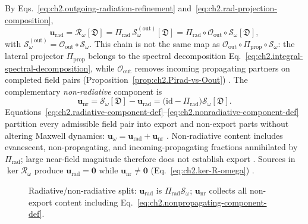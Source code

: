 By Eqs.~\eqref{eq:ch2.outgoing-radiation-refinement} and~\eqref{eq:ch2.rad-projection-composition},
\begin{equation}
\label{eq:ch2.radiative-component-def}
\mathbf{u}_{\mathrm{rad}}
=
\mathcal{R}_\omega[\mathfrak{D}]
=
\Pi_{\mathrm{rad}}\,\mathcal{S}_\omega^{\mathrm{(out)}}[\mathfrak{D}]
=
\Pi_{\mathrm{rad}}\circ\mathcal{O}_{\mathrm{out}}\circ\mathcal{S}_\omega[\mathfrak{D}],
\end{equation}
with $\mathcal{S}_\omega^{\mathrm{(out)}}=\mathcal{O}_{\mathrm{out}}\circ\mathcal{S}_\omega$.
This chain is not the same map as $\mathcal{O}_{\mathrm{out}}\circ\Pi_{\mathrm{prop}}\circ\mathcal{S}_\omega$: the lateral projector $\Pi_{\mathrm{prop}}$ belongs to the spectral decomposition Eq.~\eqref{eq:ch2.integral-spectral-decomposition}, while $\mathcal{O}_{\mathrm{out}}$ removes incoming propagating partners on completed field pairs (Proposition~\ref{prop:ch2.Pirad-vs-Oout}) \cite{stratton1941,harrington2001}. The complementary \emph{non-radiative} component is
\begin{equation}
\label{eq:ch2.nonradiative-component-def}
\mathbf{u}_{\mathrm{nr}}
=
\mathcal{S}_\omega[\mathfrak{D}]-\mathbf{u}_{\mathrm{rad}}
=
\big(\mathrm{id}-\Pi_{\mathrm{rad}}\big)\mathcal{S}_\omega[\mathfrak{D}].
\end{equation}
Equations~\eqref{eq:ch2.radiative-component-def}--\eqref{eq:ch2.nonradiative-component-def}
partition every admissible field pair into export and non-export parts without altering
Maxwell dynamics: \(\mathbf{u}_\omega=\mathbf{u}_{\mathrm{rad}}+\mathbf{u}_{\mathrm{nr}}\)
\cite{stratton1941}. Non-radiative content includes evanescent, non-propagating, and
incoming-propagating fractions annihilated by $\Pi_{\mathrm{rad}}$; large near-field
magnitude therefore does not establish export \cite{stratton1941}. Sources in
$\ker\mathcal{R}_\omega$ produce $\mathbf{u}_{\mathrm{rad}}=\mathbf{0}$ while
$\mathbf{u}_{\mathrm{nr}}\neq\mathbf{0}$ (Eq.~\eqref{eq:ch2.ker-R-omega})
\cite{stratton1941}.
\begin{figure}[t]
\centering
{}
\caption{Radiative/non-radiative split: \(\mathbf{u}_{\mathrm{rad}}\) is
\(\Pi_{\mathrm{rad}}\mathcal{S}_\omega\); \(\mathbf{u}_{\mathrm{nr}}\) collects all
non-export content including Eq.~\eqref{eq:ch2.nonpropagating-component-def}.}
\label{fig:ch2.rad-nr-component-split}
\end{figure}
